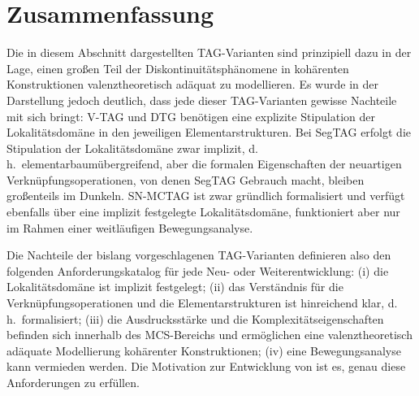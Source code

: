 \section{Zusammenfassung}

Die in diesem Abschnitt dargestellten TAG-Varianten sind prinzipiell dazu in der Lage, einen gro\ss en Teil der Diskontinuitätsphänomene in kohärenten Konstruktionen valenztheoretisch adäquat zu modellieren. Es wurde in der Darstellung jedoch deutlich, dass jede dieser TAG-Varianten gewisse Nachteile mit sich bringt: V-TAG und DTG benötigen eine explizite Stipulation der Lokalitätsdomäne in den jeweiligen Elementarstrukturen. Bei SegTAG erfolgt die Stipulation der Lokalitätsdomäne zwar implizit, d.\,h.\ elementarbaumübergreifend, aber die formalen Eigenschaften der neuartigen Verknüpfungsoperationen, von denen SegTAG Gebrauch macht, bleiben gro\ss enteils im Dunkeln. SN-MCTAG ist zwar gründlich formalisiert und verfügt ebenfalls über eine implizit festgelegte Lokalitätsdomäne, funktioniert aber nur im Rahmen einer weitläufigen Bewegungsanalyse. 

Die Nachteile der bislang vorgeschlagenen TAG-Varianten definieren also den folgenden Anforderungskatalog für jede Neu- oder Weiterentwicklung: (i) die Lokalitätsdomäne ist implizit festgelegt; (ii) das Verständnis für die Verknüpfungsoperationen und die Elementarstrukturen ist hinreichend klar, d.\,h.\ formalisiert; (iii) die Ausdrucksstärke und die Komplexitätseigenschaften befinden sich innerhalb des MCS-Bereichs und ermöglichen eine valenztheoretisch adäquate Modellierung kohärenter Konstruktionen; (iv) eine Bewegungsanalyse kann vermieden werden. Die Motivation zur Entwicklung von  ist es, genau diese Anforderungen zu erfüllen. 




















 
